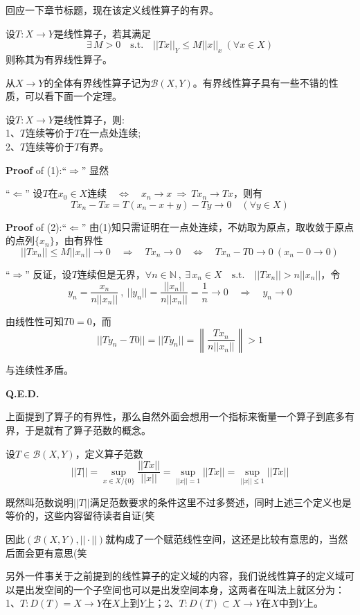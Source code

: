 回应一下章节标题，现在该定义线性算子的有界。
\begin{definition}[有界线性算子]
    设$T:X \to Y$是线性算子，若其满足
    \[\exists \, M>0 \quad \text{s.t.} \quad ||Tx||_Y \leq M||x||_x \ (\forall x \in X)\]
    则称其为有界线性算子。
\end{definition}
从$X \to Y$的全体有界线性算子记为$\mathscr{B}(X,Y)$。有界线性算子具有一些不错的性质，可以看下面一个定理。
\begin{theorem}
    设$T:X \to Y$是线性算子，则:\\
    1、$T$连续等价于$T$在一点处连续;\\
    2、$T$连续等价于$T$有界。
\end{theorem}
\textbf{Proof} of (1):“$\Rightarrow$” 显然

“$\Leftarrow$” 设$T$在$x_0 \in X$连续$\quad \Leftrightarrow \quad x_n \to x \ \Rightarrow \ Tx_n \to Tx$，则有
\[Tx_n-Tx=T(x_n-x+y)-Ty \to 0 \quad (\forall y \in X)\]

\textbf{Proof} of (2):“$\Leftarrow$” 由(1)知只需证明在一点处连续，不妨取为原点，取收敛于原点的点列$\{x_n\}$，由有界性
\[||Tx_n|| \leq M||x_n|| \to 0 \quad \Rightarrow \quad Tx_n \to 0 \quad \Leftrightarrow \quad Tx_n-T0 \to 0 \ (x_n-0 \to 0)\]

“$\Rightarrow$” 反证，设$T$连续但是无界，$\forall n \in \mathbb{N} \ , \ \exists \, x_n \in X \quad \text{s.t.} \quad ||Tx_n||>n||x_n||$，令
\[y_n=\frac{x_n}{n||x_n||} \ , \ ||y_n||=\frac{||x_n||}{n||x_n||}=\frac{1}{n} \to 0 \quad \Rightarrow \quad y_n \to 0\]

由线性性可知$T0=0$，而
\[||Ty_n-T0||=||Ty_n||=\left\|\frac{Tx_n}{n||x_n||}\right\|>1\]

与连续性矛盾。

\textbf{Q.E.D.}

上面提到了算子的有界性，那么自然外面会想用一个指标来衡量一个算子到底多有界，于是就有了算子范数的概念。
\begin{definition}[算子范数]
    设$T \in \mathscr{B}(X,Y)$，定义算子范数
    \[||T||=\mathop \text{sup}\limits_{x \in X/\{0\}}\frac{||Tx||}{||x||}=\mathop \text{sup}\limits_{||x||=1}||Tx||=\mathop \text{sup}\limits_{||x|| \leq 1}||Tx||\]
\end{definition}
既然叫范数说明$||T||$满足范数要求的条件这里不过多赘述，同时上述三个定义也是等价的，这些内容留待读者自证(笑

因此$(\mathscr{B}(X,Y),||\cdot||)$就构成了一个赋范线性空间，这还是比较有意思的，当然后面会更有意思(笑

另外一件事关于之前提到的线性算子的定义域的内容，我们说线性算子的定义域可以是出发空间的一个子空间也可以是出发空间本身，这两者在叫法上就区分为：
1、$T:D(T)=X \to Y$在$X$上到$Y$上；2、$T:D(T) \subset X \to Y$在$X$中到$Y$上。

